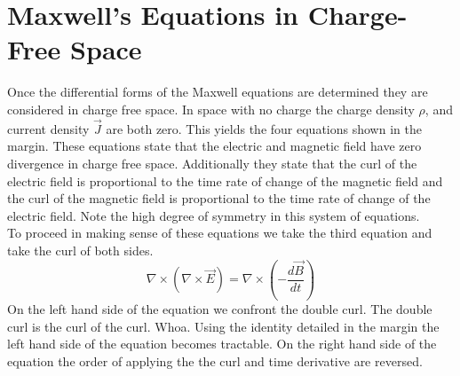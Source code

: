 \section{Maxwell's Equations in Charge-Free Space}
Once the differential forms of the Maxwell equations are determined they are considered in charge free space.  In space with no charge the charge density $\rho$, and current density $\overrightarrow{J}$ are both zero.  This yields the four equations shown in the margin.
These equations state that the electric and magnetic field have zero divergence in charge free space.  Additionally they state that the curl of the electric field is proportional to the time rate of change of the magnetic field and the curl of the magnetic field is proportional to the time rate of change of the electric field.  Note the high degree of symmetry in this system of equations.\\
To proceed in making sense of these equations we take the third equation and take the curl of both sides.  
$$\nabla \times \left(\nabla \times \overrightarrow{E}\right) = \nabla \times\left( -\frac{d\overrightarrow{B}}{dt}\right)  $$
On the left hand side of the equation we confront the double curl.  The double curl is the curl of the curl.  Whoa.  Using the identity detailed in the margin the left hand side of the equation becomes tractable.  On the right hand side of the equation the order of applying the the curl and time derivative are reversed.
